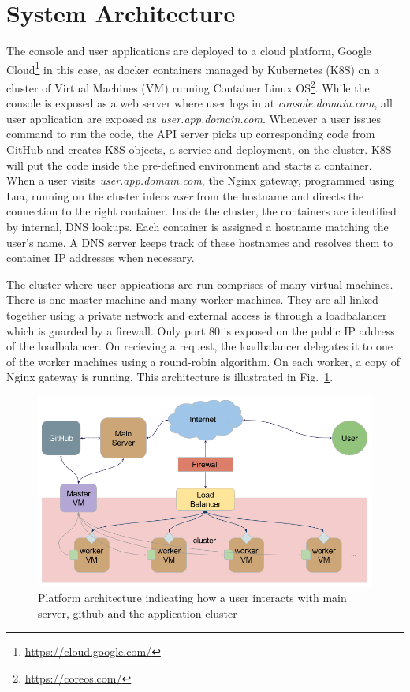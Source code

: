 \documentclass[DD]{iitmdiss}
\begin{document}
\section{System Architecture}
The console and user applications are deployed to a cloud platform, Google Cloud\footnote{\url{https://cloud.google.com/}} in this case, as docker containers managed by Kubernetes (K8S) on a cluster of Virtual Machines (VM) running Container Linux OS\footnote{\url{https://coreos.com/}}. While the console is exposed as a web server where user logs in at \textit{console.domain.com}, all user application are exposed as \textit{user.app.domain.com}. Whenever a user issues command to run the code, the API server picks up corresponding code from GitHub and creates K8S objects, a service and deployment, on the cluster. K8S will put the code inside the pre-defined environment and starts a container. When a user visits \textit{user.app.domain.com}, the Nginx gateway, programmed using Lua, running on the cluster infers \textit{user} from the hostname and directs the connection to the right container. Inside the cluster, the containers are identified by internal, DNS lookups. Each container is assigned a hostname matching the user's name. A DNS server keeps track of these hostnames and resolves them to container IP addresses when necessary. 

The cluster where user appications are run comprises of many virtual machines. There is one master machine and many worker machines. They are all linked together using a private network and external access is through a loadbalancer which is guarded by a firewall. Only port 80 is exposed on the public IP address of the loadbalancer. On recieving a request, the loadbalancer delegates it to one of the worker machines using a round-robin algorithm. On each worker, a copy of Nginx gateway is running. This architecture is illustrated in Fig.~\ref{fig:systemarch}. 

\begin{figure}
\centering
\includegraphics[width=0.9\linewidth]{img/system_arch}
\caption[Platform architecture]{Platform architecture indicating how a user interacts with main server, github and the application cluster}
\label{fig:systemarch}
\end{figure}
\end{document}
